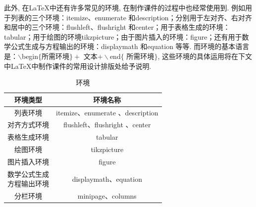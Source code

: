 此外, 在\LaTeX{}中还有许多常见的环境, 在制作课件的过程中也经常使用到. 例如用于列表的三个环境：itemize、enumerate 和description；分别用于左对齐、右对齐和居中的三个环境：flushleft、flushright 和center；用于表格生成的环境：tabular；用于绘图的环境tikzpicture；由于图片插入的环境：figure；还有用于数学公式生成与方程输出的环境：displaymath 和equation 等等. 而环境的基本语言是：$\backslash$begin$\{$所需环境$\}+$ 文本$+\backslash$end$\{$ 所需环境$\}$, 这些环境的具体运用将在下文中\LaTeX{}中制作课件的常用设计排版处给予说明.
\begin{table}
\centering
\renewcommand\arraystretch{1.5}  %
\begin{tabular}{|c|c|}
  \hline
  环境类型 & 环境名称 \\ \hline
  列表环境 & itemize、enumerate 、description \\ \hline
  对齐方式环境 & flushleft、flushright 、center \\ \hline
  表格生成环境 & tabular \\\hline
  绘图环境 & tikzpicture \\\hline
  图片插入环境& figure \\\hline
  \makecell[c]{数学公式生成\\方程输出环境} & displaymath、equation \\\hline
  分栏环境& minipage、columns \\\hline
\end{tabular}
\caption{环境}
\end{table}
